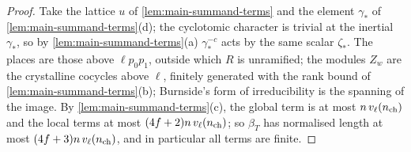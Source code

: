 \begin{proof}
Take the lattice $u$ of \cref{lem:main-summand-terms} and the element $\gamma_*$ of \cref{lem:main-summand-terms}(d); the cyclotomic character is trivial at the inertial $\gamma_*$, so by \cref{lem:main-summand-terms}(a) $\gamma_*^{-c}$ acts by the same scalar $\zeta_*$. The places are those above $\ell p_0p_1$, outside which $R$ is unramified; the
modules $Z_w$ are the crystalline cocycles above $\ell$, finitely generated with the rank bound of \cref{lem:main-summand-terms}(b); Burnside's form of irreducibility is the spanning of the image. By \cref{lem:main-summand-terms}(c), the global term is at most $n\,v_\ell(n_{\rm ch})$ and the local terms at most
$(4f+2)n\,v_\ell(n_{\rm ch})$; so $\beta_T$ has normalised length at most $(4f+3)n\,v_\ell(n_{\rm ch})$, and in particular all terms are finite.
\end{proof}
